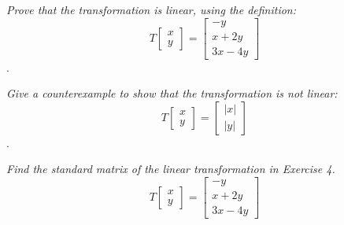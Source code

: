 \documentclass[12pt,letterpaper]{hmcpset}
\begin{document}
\begin{solution}
    
\end{solution}

\newpage


\begin{problem}[3.6.4]
\textit{Prove that the transformation is linear, using the definition:}
    \[
    T\begin{bmatrix}
    x \\ y
    \end{bmatrix} = 
    \begin{bmatrix}
    -y \\ x + 2y \\ 3x - 4y
    \end{bmatrix}
    \].
\end{problem}

\begin{solution}
    
\end{solution}

\newpage


\begin{problem}[3.6.8]
    \textit{Give a counterexample to show that the transformation is not linear:}
    \[
    T\begin{bmatrix}
    x \\ y
    \end{bmatrix} = 
    \begin{bmatrix}
    |x| \\ |y|
    \end{bmatrix}
    \].
\end{problem}

\begin{solution}
    
\end{solution}

\newpage


\begin{problem}[3.6.12]
    \textit{Find the standard matrix of the linear transformation in Exercise 4.}
    $$
    T\begin{bmatrix}
    x \\ y
    \end{bmatrix} = 
    \begin{bmatrix}
    -y \\ x + 2y \\ 3x - 4y
    \end{bmatrix}
    $$
\end{problem}
\end{document}
